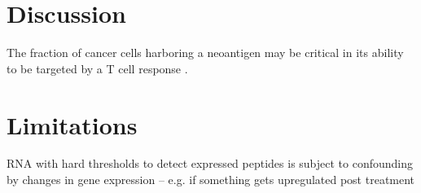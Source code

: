 \section*{Discussion}

The fraction of cancer cells harboring a neoantigen may be critical in its ability to be targeted by a T cell response \cite{McGranahan_2016}.

\section*{Limitations}
RNA with hard thresholds to detect expressed peptides is subject to confounding by changes in gene expression -- e.g. if something gets upregulated post treatment





